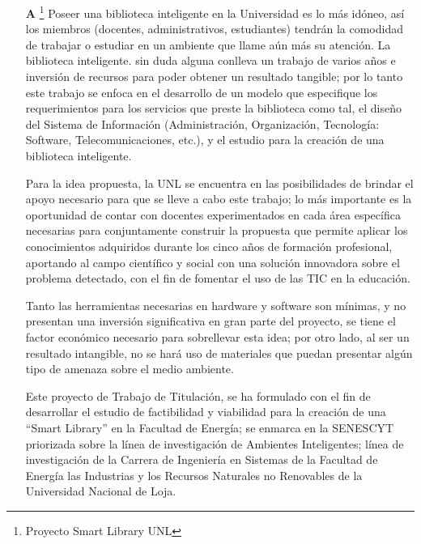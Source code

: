\small
\begin{itemize}
    \item[\textbf{A}] \footnote{Proyecto Smart Library UNL} Poseer una biblioteca inteligente en la Universidad es lo más idóneo, así los miembros (docentes, administrativos, estudiantes) tendrán la comodidad de trabajar o estudiar en un ambiente que llame aún más su atención.
    La biblioteca inteligente. sin duda alguna conlleva un trabajo de varios años e inversión de recursos para poder obtener un resultado tangible; por lo tanto este trabajo se enfoca en el desarrollo de un modelo que especifique los requerimientos para los servicios que preste la biblioteca como tal, el diseño del Sistema de Información (Administración, Organización, Tecnología: Software, Telecomunicaciones, etc.), y el estudio para la creación de una biblioteca inteligente.
    
    Para la idea propuesta, la UNL se encuentra en las posibilidades de brindar el apoyo necesario para que se lleve a cabo este trabajo; lo más importante es la oportunidad de contar con docentes experimentados en cada área específica necesarias para conjuntamente construir la propuesta que permite aplicar los conocimientos adquiridos durante los cinco años de formación profesional, aportando al campo científico y social con una solución innovadora sobre el problema detectado, con el fin de fomentar el uso de las TIC en la educación. 
    
    Tanto las herramientas necesarias en hardware y software son mínimas, y no presentan una inversión significativa en gran parte del proyecto, se tiene el factor económico necesario para sobrellevar esta idea; por otro lado, al ser un resultado intangible, no se hará uso de materiales que puedan presentar algún tipo de amenaza sobre el medio ambiente. 
    
    Este proyecto de Trabajo de Titulación, se ha formulado con el fin de desarrollar el estudio de factibilidad y viabilidad para la creación de una “Smart Library” en la Facultad de Energía; se enmarca en la SENESCYT priorizada sobre la línea de investigación de Ambientes Inteligentes; línea de investigación de la Carrera de Ingeniería en Sistemas de la Facultad de Energía las Industrias y los Recursos Naturales no Renovables de la Universidad Nacional de Loja. 
    

\end{itemize}
